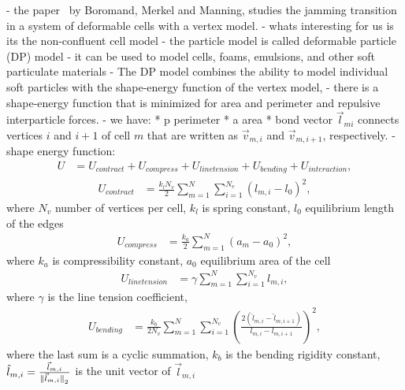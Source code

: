 - the paper~\cite{Boromand2018} by Boromand, Merkel and Manning, studies the jamming transition in a system of deformable cells with a vertex model. 
- whats interesting for us is its the non-confluent cell model 
- the particle model is called deformable particle (DP) model
- it can be used to model cells, foams, emulsions, and other soft particulate materials
- The DP model combines the ability to model individual soft particles with the shape-energy function of the vertex model,
- there is a shape-energy function that is minimized for area and perimeter and repulsive interparticle forces. 
- we have:
* p perimeter 
* a area 
* bond vector $\vec{l}_{mi}$ connects vertices $i$ and $i+1$ of cell $m$ that are written as $\vec{v}_{m,i}$ and $\vec{v}_{m,i+1}$, respectively.
- shape energy function:
\begin{align*}
	U &= U_{contract} + U_{compress} + U_{line tension} + U_{bending} + U_{interaction} ,
\end{align*}
\begin{align*}
	U_{contract} &= \frac{k_l N_v}{2} \sum\limits_{m=1}^{N} \sum\limits_{i=1}^{N_v} (l_{m,i}-l_0)^2,
\end{align*}
where $N_v$ number of vertices per cell, $k_l$ is spring constant, $l_0$ equilibrium length of the edges 
\begin{align*}
	U_{compress} &= \frac{k_a}{2} \sum\limits_{m=1}^{N} (a_m - a_0)^2, 
\end{align*}
where $k_a$ is compressibility constant, $a_0$ equilibrium area of the cell
\begin{align*}
	U_{line tension} &= \gamma \sum\limits_{m=1}^{N} \sum\limits_{i=1}^{N_v} l_{m,i} ,
\end{align*}
where $\gamma$ is the line tension coefficient, 
\begin{align*}
	U_{bending} &= \frac{k_b}{2 N_v} \sum\limits_{m=1}^{N} \sum\limits_{i=1}^{N_v} \left( \frac{2( \hat{l}_{m,i} - \hat{l}_{m,i+1})}{l_{m,i} - l_{m,i+1}}  \right)^2 ,
\end{align*}
where the last sum is a cyclic summation, $k_b$ is the bending rigidity constant, $\hat{l}_{m,i} = \frac{\vec{l}_{m,i}}{\norm[\vec{l}_{m,i}]} $ is the unit vector of $\vec{l}_{m,i}$


